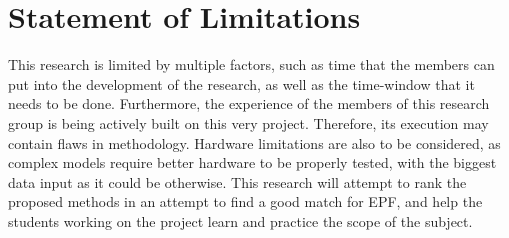 \section{Statement of Limitations}

This research is limited by multiple factors, such as time that the members can put into the development of the research, as well as the time-window that it needs to be done. Furthermore, the experience of the members
of this research group is being actively built on this very project. Therefore, its execution may contain flaws in methodology.
Hardware limitations are also to be considered, as complex models require better hardware to be properly tested, with the biggest data input as it could be otherwise.
This research will attempt to rank the proposed methods in an attempt to find a good match for EPF, and help the students working on the project learn and practice the scope of the subject.